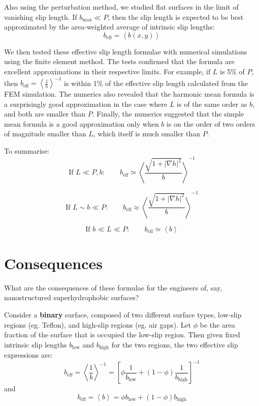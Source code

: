 \documentclass[12pt, a4paper, twoside, openright]{book}
\newcommand{\beff}{\ensuremath{b_{\mathrm{eff}}}}
\newcommand{\bmax}{\ensuremath{b_{\mathrm{max}}}}
\newcommand{\blow}{\ensuremath{b_{\mathrm{low}}}}
\newcommand{\bhigh}{\ensuremath{b_{\mathrm{high}}}}
\begin{document}
Also using the perturbation method, we studied flat surfaces in the limit of vanishing slip length. If $\bmax \ll P$, then the slip length is expected to be best approximated by the area-weighted average of intrinsic slip lengths:
\begin{equation}
\beff = \left< b(x,y) \right>
\end{equation}


We then tested these effective slip length formulae with numerical simulations using the finite element method.  The tests confirmed that the formula are excellent approximations in their respective limits. For example, if $L$ is 5\% of $P$, then  $ \beff = \left< \frac{1}{b} \right>^{-1} $ is within 1\% of the effective slip length calculated from the FEM simulation. The numerics also revealed that the harmonic mean formula is a surprisingly good approximation in the case where $L$ is of the same order as $b$, and both are smaller than $P$.  Finally, the numerics suggested that the simple mean formula is a good approximation only when $b$ is on the order of two orders of magnitude smaller than $L$, which itself is much smaller than $P$.

To summarise:
\begin{equation}
\text{If  } L \ll P,b: \qquad \beff \simeq \left< \frac{\sqrt{1 + |\nabla h|^2}}{b}  \right>^{-1}
\end{equation}

\begin{equation}
\text{If  } L \sim b \ll P: \qquad \beff \approx \left< \frac{\sqrt{1 + |\nabla h|^2}}{b}  \right>^{-1}
\end{equation}

\begin{equation}
\text{If  } b \ll L \ll P: \qquad \beff \simeq \left< b  \right>
\end{equation}



\section{Consequences}

What are the consequences of these formulae for the engineers of, say, nanostructured superhydrophobic surfaces?

Consider a \textbf{binary} surface, composed of two different surface types, low-slip regions (eg. Teflon), and high-slip regions (eg. air gaps).  Let $\phi$ be the area fraction of the surface that is occupied the low-slip region.  
Then given fixed intrinsic slip lengths $\blow$ and $\bhigh$ for the two regions, the two effective slip expressions are:
\begin{equation}
\beff = \left< \frac{1}{b} \right>^{-1} =
\left[ \phi \frac{1}{\blow} + (1-\phi) \frac{1}{\bhigh} \right]^{-1}
\label{eq:harmbinary}
\end{equation}
and
\begin{equation}
\beff = \left< b \right> = \phi \blow + (1-\phi) \bhigh
\end{equation}
\end{document}
